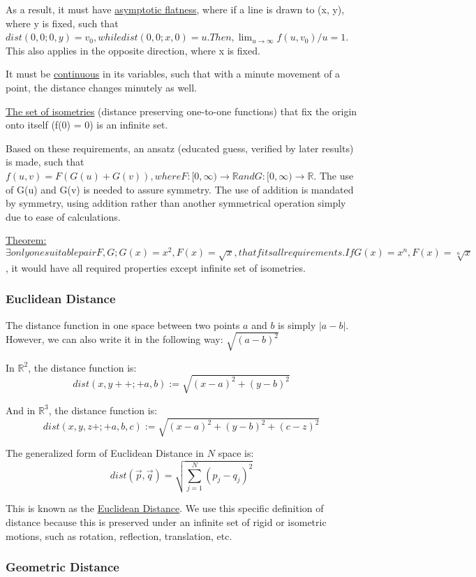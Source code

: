 \documentclass[11 pt, twoside]{article}
\begin{document}
As a result, it must have \underline{asymptotic flatness}, where if a line is drawn to (x, y), where y is fixed, such that $dist(0,0; 0, y) = v_0, while dist(0, 0; x, 0) = u. Then, \lim_{u \to \infty} f(u, v_0)/u = 1$. This also applies in the opposite direction, where x is fixed.

It must be \underline{continuous} in its variables, such that with a minute movement of a point, the distance changes minutely as well.

\underline{The set of isometries} (distance preserving one-to-one functions) that fix the origin onto itself (f(0) = 0) is an infinite set.

Based on these requirements, an ansatz (educated guess, verified by later results) is made, such that $f(u, v) = F(G(u) + G(v)), where F: [0, \infty) \to \mathbb{R} and G: [0, \infty) \to \mathbb{R}$. The use of G(u) and G(v) is needed to assure symmetry. The use of addition is mandated by symmetry, using addition rather than another symmetrical operation simply due to ease of calculations.

\underline{Theorem:} $\exists only one suitable pair F, G; G(x) = x^2, F(x) = \sqrt{x}, that fits all requirements. If G(x) = x^n, F(x) = \sqrt[n]{x}$, it would have all required properties except infinite set of isometries.

\subsubsection{Euclidean Distance}
The distance function in one space between two points $a$ and $b$ is simply $|a
- b|$. However, we can also write it in the following way: $\sqrt{(a - b)^2}$

In $\mathbb{R}^2$, the distance function is:
$$dist(x, y++;+a,b) := \sqrt{(x - a)^2 + (y - b)^2}$$

And in $\mathbb{R}^3$, the distance function is:
$$dist(x, y, z+;+ a,b,c) := \sqrt{(x - a)^2 + (y - b)^2 + (c - z)^2}$$

The generalized form of Euclidean Distance in $N$ space is:
$$dist(\vec{p}, \vec{q}) = \sqrt{\sum_{j = 1}^N (p_j - q_j)^2}$$

This is known as the \underline{Euclidean Distance}. We use this specific
definition of distance because this is preserved under an infinite set of rigid
or isometric motions, such as rotation, reflection, translation, etc.

\subsubsection{Geometric Distance}
\end{document}
